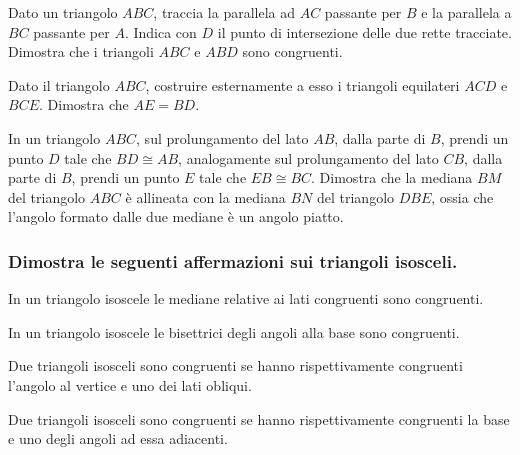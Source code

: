 \begin{multicols}{2}
\begin{esercizio}
\label{ese:2.25}
Dato un triangolo $ABC$, traccia la parallela ad $AC$ passante per $B$ e la parallela a $BC$ passante per $A$. Indica con $D$ il punto di intersezione delle due rette tracciate. Dimostra che i triangoli $ABC$ e $ABD$ sono congruenti.
\end{esercizio}

\begin{esercizio}
\label{ese:2.26}
Dato il triangolo $ABC$, costruire esternamente a esso i triangoli equilateri $ACD$ e $BCE$. Dimostra che $AE=BD$.
\end{esercizio}

\begin{esercizio}
\label{ese:2.27}
In un triangolo $ABC$, sul prolungamento del lato $AB$, dalla parte di $B$, prendi un punto $D$ tale che $BD\cong AB$, analogamente sul prolungamento del lato $CB$, dalla parte di $B$, prendi un punto $E$ tale che $EB\cong BC$. Dimostra che la mediana $BM$ del triangolo $ABC$ è allineata con la mediana $BN$ del triangolo $DBE$, ossia che l'angolo formato dalle due mediane è un angolo piatto.
\end{esercizio}

\subsubsection*{Dimostra le seguenti affermazioni sui triangoli isosceli.}

\begin{esercizio}
\label{ese:2.28}
In un triangolo isoscele le mediane relative ai lati congruenti sono congruenti. 
\end{esercizio}

\begin{esercizio}
\label{ese:2.29}
In un triangolo isoscele le bisettrici degli angoli alla base sono congruenti. 
\end{esercizio}

\begin{esercizio}
\label{ese:2.30}
Due triangoli isosceli sono congruenti se hanno rispettivamente congruenti l'angolo al vertice e uno dei lati obliqui.
\end{esercizio}

\begin{esercizio}
\label{ese:2.31}
Due triangoli isosceli sono congruenti se hanno rispettivamente congruenti la base e uno degli angoli ad essa adiacenti.
\end{esercizio}


\end{multicols}
